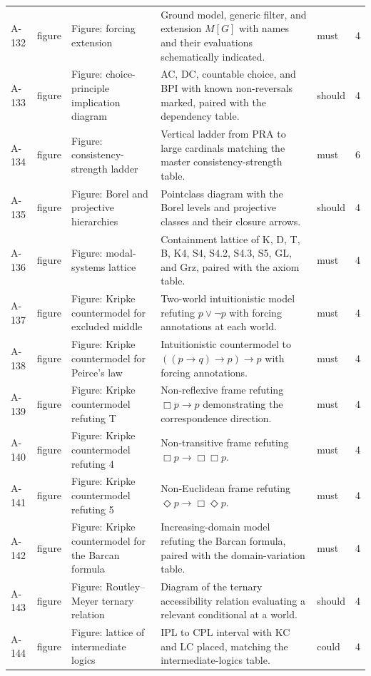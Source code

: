 \begin{longtable}{@{}p{0.45in}p{0.78in}p{2.02in}p{2.6in}p{0.42in}p{0.16in}@{}}
A-132 & figure & Figure: forcing extension & Ground model, generic filter, and extension \(M[G]\) with names and their evaluations schematically indicated. & must & 4 \\
A-133 & figure & Figure: choice-principle implication diagram & AC, DC, countable choice, and BPI with known non-reversals marked, paired with the dependency table. & should & 4 \\
A-134 & figure & Figure: consistency-strength ladder & Vertical ladder from PRA to large cardinals matching the master consistency-strength table. & must & 6 \\
A-135 & figure & Figure: Borel and projective hierarchies & Pointclass diagram with the Borel levels and projective classes and their closure arrows. & should & 4 \\
A-136 & figure & Figure: modal-systems lattice & Containment lattice of K, D, T, B, K4, S4, S4.2, S4.3, S5, GL, and Grz, paired with the axiom table. & must & 4 \\
A-137 & figure & Figure: Kripke countermodel for excluded middle & Two-world intuitionistic model refuting \(p\lor\neg p\) with forcing annotations at each world. & must & 4 \\
A-138 & figure & Figure: Kripke countermodel for Peirce's law & Intuitionistic countermodel to \(((p\to q)\to p)\to p\) with forcing annotations. & must & 4 \\
A-139 & figure & Figure: Kripke countermodel refuting T & Non-reflexive frame refuting \(\Box p\to p\) demonstrating the correspondence direction. & must & 4 \\
A-140 & figure & Figure: Kripke countermodel refuting 4 & Non-transitive frame refuting \(\Box p\to\Box\Box p\). & must & 4 \\
A-141 & figure & Figure: Kripke countermodel refuting 5 & Non-Euclidean frame refuting \(\Diamond p\to\Box\Diamond p\). & must & 4 \\
A-142 & figure & Figure: Kripke countermodel for the Barcan formula & Increasing-domain model refuting the Barcan formula, paired with the domain-variation table. & must & 4 \\
A-143 & figure & Figure: Routley--Meyer ternary relation & Diagram of the ternary accessibility relation evaluating a relevant conditional at a world. & should & 4 \\
A-144 & figure & Figure: lattice of intermediate logics & IPL to CPL interval with KC and LC placed, matching the intermediate-logics table. & could & 4 \\

\end{longtable}
